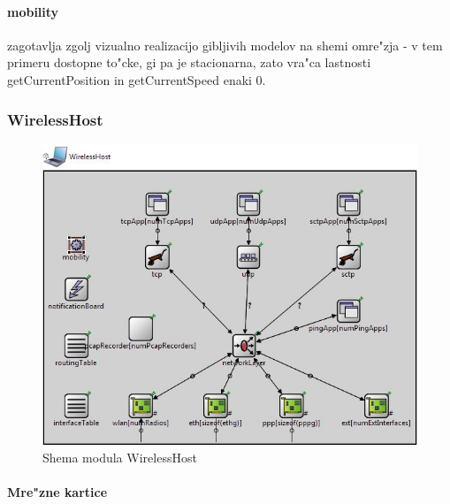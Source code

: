 \documentclass[a4paper,11pt]{article}
\begin{document}
\paragraph{mobility}
\label{description:mobility}

zagotavlja zgolj vizualno realizacijo gibljivih modelov na shemi omre"zja - v tem primeru dostopne to"cke, gi pa je stacionarna, zato vra"ca lastnosti getCurrentPosition in getCurrentSpeed enaki 0.


\subsubsection{WirelessHost}
\label{description:wirelesshost}



\begin{figure}[htbp]
    \begin{center}
        \includegraphics[scale=0.8]{img/host.jpg}
        \caption{Shema modula WirelessHost}
	\label{image:wirelesshost}
    \end{center}
\end{figure}


\paragraph{Mre"zne kartice}
\label{description:mreznekartice}
\end{document}
